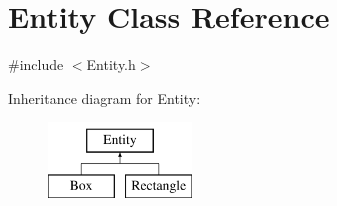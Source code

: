 \hypertarget{classEntity}{}\section{Entity Class Reference}
\label{classEntity}


{\ttfamily \#include $<$Entity.\+h$>$}

Inheritance diagram for Entity\+:\begin{figure}[H]
\begin{center}
\leavevmode
\includegraphics[height=2.000000cm]{classEntity}
\end{center}
\end{figure}
